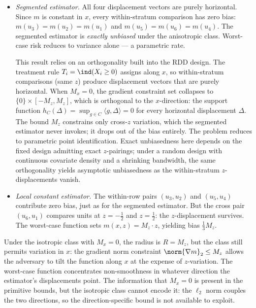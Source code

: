 \begin{itemize}
	\item \emph{Segmented estimator.}
	All four displacement vectors are purely horizontal.
	Since $m$ is constant in $x$, every within-stratum comparison has zero bias: $m(u_3) = m(u_2) = m(u_1)$ and $m(u_5) = m(u_6) = m(u_4)$.
	The segmented estimator is \emph{exactly unbiased} under the anisotropic class.
	Worst-case risk reduces to variance alone --- a parametric rate.

	This result relies on an orthogonality built into the RDD design.
	The treatment rule $T_i = \ind(X_i \geq 0)$ assigns along $x$, so within-stratum comparisons (same $z$) produce displacement vectors that are purely horizontal.
	When $M_x = 0$, the gradient constraint set collapses to $\{0\} \times [-M_z, M_z]$, which is orthogonal to the $x$-direction: the support function $h_C(\Delta) = \sup_{g \in C} \langle g, \Delta \rangle = 0$ for every horizontal displacement $\Delta$.
	The bound $M_z$ constrains only cross-$z$ variation, which the segmented estimator never invokes; it drops out of the bias entirely.
	The problem reduces to parametric point identification.
	Exact unbiasedness here depends on the fixed design admitting exact $z$-pairings; under a random design with continuous covariate density and a shrinking bandwidth, the same orthogonality yields asymptotic unbiasedness as the within-stratum $z$-displacements vanish.

	\item \emph{Local constant estimator.}
	The within-row pairs $(u_3, u_2)$ and $(u_5, u_4)$ contribute zero bias, just as for the segmented estimator.
	But the cross pair $(u_6, u_1)$ compares units at $z = -\tfrac{1}{2}$ and $z = \tfrac{1}{2}$: the $z$-displacement survives.
	The worst-case function sets $m(x, z) = M_z \cdot z$, yielding bias $\tfrac{1}{3} M_z$.
\end{itemize}

Under the isotropic class with $M_x = 0$, the radius is $R = M_z$, but the class still permits variation in $x$: the gradient norm constraint $\norm{\nabla m}_2 \leq M_z$ allows the adversary to tilt the function along $x$ at the expense of $z$-variation.
The worst-case function concentrates non-smoothness in whatever direction the estimator's displacements point.
The information that $M_x = 0$ is present in the primitive bounds, but the isotropic class cannot encode it: the $\ell_2$ norm couples the two directions, so the direction-specific bound is not available to exploit.


